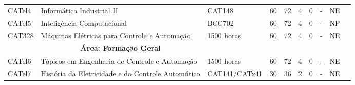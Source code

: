 \begin{table}[tbp]
{\begin{tabular}{llllllllll}
			\multicolumn{1}{|l|}{CATel4}                    & \multicolumn{1}{l|}{Informática Industrial II}                                            & \multicolumn{1}{l|}{CAT148}                 & \multicolumn{1}{l|}{60}                                                           & \multicolumn{1}{l|}{72}               & \multicolumn{1}{l|}{4}  & \multicolumn{1}{l|}{0}  & \multicolumn{1}{l|}{-}                & \multicolumn{1}{l|}{NE}            &  \\ \cline{1-9}
			\multicolumn{1}{|l|}{CATel5}                    & \multicolumn{1}{l|}{Inteligência Computacional}                                           & \multicolumn{1}{l|}{BCC702}                 & \multicolumn{1}{l|}{60}                                                           & \multicolumn{1}{l|}{72}               & \multicolumn{1}{l|}{4}  & \multicolumn{1}{l|}{0}  & \multicolumn{1}{l|}{-}                & \multicolumn{1}{l|}{NP}            &  \\ \cline{1-9}
			\multicolumn{1}{|l|}{CAT328}                    & \multicolumn{1}{l|}{Máquinas Elétricas para Controle e Automação}                         & \multicolumn{1}{l|}{1500 horas}             & \multicolumn{1}{l|}{60}                                                           & \multicolumn{1}{l|}{72}               & \multicolumn{1}{l|}{4}  & \multicolumn{1}{l|}{0}  & \multicolumn{1}{l|}{-}                & \multicolumn{1}{l|}{NE}            &  \\ \cline{1-9}
			\multicolumn{1}{|l|}{}                          & \multicolumn{1}{c|}{\textbf{Área: Formação Geral}}                                        & \multicolumn{1}{l|}{}                       & \multicolumn{1}{l|}{}                                                             & \multicolumn{1}{l|}{}                 & \multicolumn{1}{l|}{}   & \multicolumn{1}{l|}{}   & \multicolumn{1}{l|}{}                 & \multicolumn{1}{l|}{}              &  \\ \cline{1-9}
			\multicolumn{1}{|l|}{CATel6}                    & \multicolumn{1}{l|}{Tópicos em Engenharia de Controle e Automação}                        & \multicolumn{1}{l|}{1500 horas}             & \multicolumn{1}{l|}{60}                                                           & \multicolumn{1}{l|}{72}               & \multicolumn{1}{l|}{4}  & \multicolumn{1}{l|}{0}  & \multicolumn{1}{l|}{-}                & \multicolumn{1}{l|}{NE}            &  \\ \cline{1-9}
			\multicolumn{1}{|l|}{CATel7}                    & \multicolumn{1}{l|}{História da Eletricidade e do Controle Automático}                    & \multicolumn{1}{l|}{CAT141/CATx41}          & \multicolumn{1}{l|}{30}                                                           & \multicolumn{1}{l|}{36}               & \multicolumn{1}{l|}{2}  & \multicolumn{1}{l|}{0}  & \multicolumn{1}{l|}{-}                & \multicolumn{1}{l|}{NE}            &  \\ \cline{1-9}

\end{tabular}}
\end{table}
